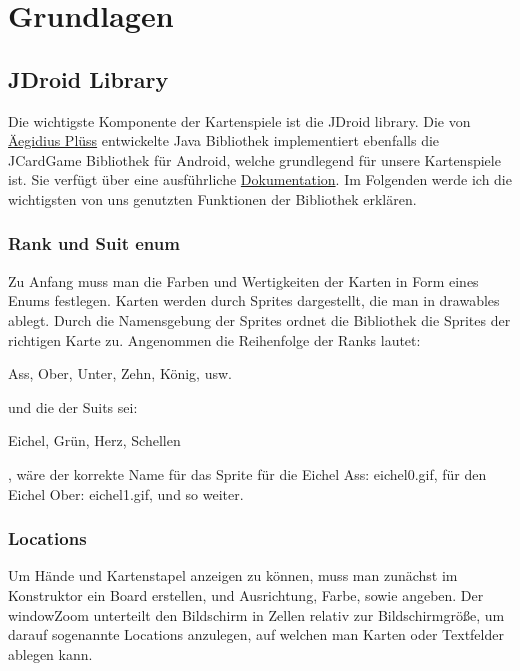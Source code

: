 \chapter{Grundlagen}

\section{JDroid Library}
\sectionauthor{\philipp}

Die wichtigste Komponente der Kartenspiele ist die JDroid library. Die von
\href{http://www.aplu.ch/home/apluhomex.jsp?site=99}{Äegidius Plüss} entwickelte
Java Bibliothek implementiert ebenfalls die JCardGame Bibliothek für Android,
welche grundlegend für unsere Kartenspiele ist. Sie verfügt über eine
ausführliche
\href{http://www.java-online.ch/gamegrid/index.php?inhalt_links=navigation.inc.php&inhalt_mitte=iframedoc1.html}{Dokumentation}.
Im Folgenden werde ich die wichtigsten von uns genutzten Funktionen der
Bibliothek erklären.

\subsection{Rank und Suit enum}

Zu Anfang muss man die Farben und Wertigkeiten der Karten in Form eines Enums
festlegen. Karten werden durch Sprites dargestellt, die man in drawables ablegt.
Durch die Namensgebung der Sprites ordnet die Bibliothek die Sprites der
richtigen Karte zu. Angenommen die Reihenfolge der Ranks lautet:

Ass, Ober, Unter, Zehn, König, usw.

und die der Suits sei:

Eichel, Grün, Herz, Schellen

, wäre der korrekte Name für das Sprite für die Eichel Ass: eichel0.gif, für den
Eichel Ober: eichel1.gif, und so weiter.

\subsection{Locations}

Um Hände und Kartenstapel anzeigen zu können, muss man zunächst im Konstruktor
ein Board erstellen, und Ausrichtung, Farbe, sowie 
angeben. Der windowZoom unterteilt den Bildschirm in Zellen relativ zur
Bildschirmgröße, um darauf sogenannte Locations anzulegen, auf welchen man
Karten oder Textfelder ablegen kann.

